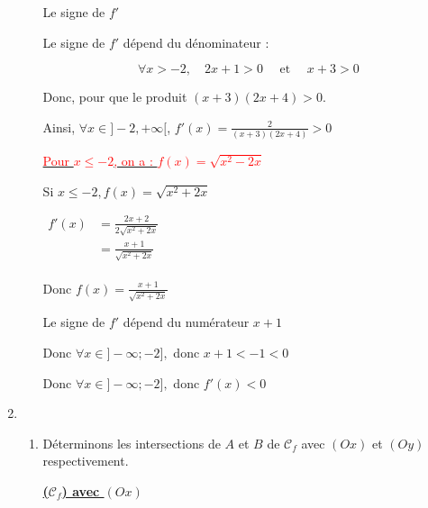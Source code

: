 \documentclass[12pt,a4paper]{article}
\begin{document}
\begin{enumerate}
\begin{enumerate}
Le signe de \( f' \)

Le signe de \( f' \) dépend du dénominateur :

\[
\forall x > -2, \quad 2x+1 > 0 \quad \text{ et } \quad x+3 > 0
\]

Donc, pour que le produit \((x+3)(2x+4) > 0\).

Ainsi, \( \forall x \in ]-2, +\infty[ \), \( f'(x) = \frac{2}{(x+3)(2x+4)} > 0 \)

\underline{\textcolor{red}{Pour \( x \leq -2 \), on a : \( f(x) = \sqrt{x^{2}-2x}\) }}

Si \( x \leq -2, f(x) = \sqrt{ x^{2} + 2x } \)

\(
\begin{aligned}
f'(x) &= \frac{2x+2}{2\sqrt{ x^{2} + 2x }}\\
      &= \frac{x+1}{\sqrt{ x^{2} + 2x }}\\ 
\end{aligned}
\)

\( \text{Donc } f(x)=\frac{x+1}{\sqrt{ x^{2} + 2x }}\)

Le signe de \(f'\) dépend du numérateur \( x+1 \)

Donc \( \forall x \in ]-\infty;-2], \) donc \( x+1 < -1 < 0 \)

Donc \( \forall x \in ]-\infty;-2], \) donc \( f'(x)< 0 \)

\begin{center}
\end{center}

\end{enumerate}
\item
\begin{enumerate}
    \item Déterminons les intersections de $A$ et $B$ de $\mathcal{C}_{f}$ avec $(Ox)$ et $(Oy)$ respectivement.
    
    \underline{ \textbf{ ($\mathcal{C}_{f}$) avec $(Ox)$ } }


\end{enumerate}
\end{enumerate}
\end{document}
